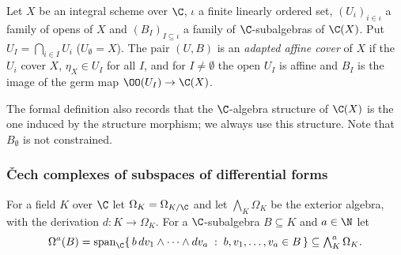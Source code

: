 \begin{definition}\label{pf:hlf-cech:def:affcov}
Let $X$ be an integral scheme over $\C$, $\iota$ a finite linearly ordered set, $(U_i)_{i\in\iota}$ a family of opens of $X$ and
$(B_I)_{I\subseteq\iota}$ a family of $\C$-subalgebras of $\C(X)$. Put $U_I=\bigcap_{i\in I}U_i$ ($U_\emptyset=X$). The pair $(U,B)$ is an
\emph{adapted affine cover} of $X$ if the $U_i$ cover $X$, $\eta_X\in U_I$ for all $I$, and for $I\ne\emptyset$ the open $U_I$ is affine and $B_I$ is
the image of the germ map $\OO(U_I)\to\C(X)$.
\end{definition}

The formal definition also records that the $\C$-algebra structure of $\C(X)$ is the one induced by the structure morphism; we always use
this structure. Note that $B_\emptyset$ is not constrained.

\subsubsection{\v{C}ech complexes of subspaces of differential forms}
For a field $K$ over $\C$ let $\Omega_K=\Omega_{K/\C}$ and let $\bigwedge_K\Omega_K$ be the exterior algebra, with the derivation
$d\colon K\to\Omega_K$. For a $\C$-subalgebra $B\subseteq K$ and $a\in\N$ let
\[
  \Omega^a(B)=\operatorname{span}_\C\{\,b\,dv_1\wedge\dots\wedge dv_a\;:\;b,v_1,\dots,v_a\in B\,\}\subseteq\textstyle\bigwedge^a_K\Omega_K .
\]

